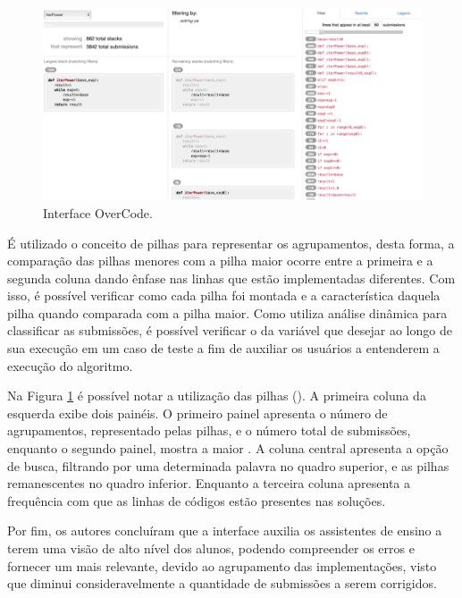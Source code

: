 	    \begin{figure}[ht]
	        \centering
	        \includegraphics[scale=0.4]{imagem/overCode.png}
	        \captionsetup{justification=centering}
	        \caption{Interface OverCode.}
	        \label{fig:interfaceOverCode}
	    \end{figure}
	    
	    É utilizado o conceito de pilhas para representar os agrupamentos, desta forma,
	    a comparação das pilhas menores com a pilha maior ocorre entre a primeira e a
	    segunda coluna dando ênfase nas linhas que estão implementadas diferentes. Com
	    isso, é possível verificar como cada pilha foi montada e a característica daquela
	    pilha quando comparada com a pilha maior. Como utiliza análise dinâmica para
	    classificar as submissões, é possível verificar o  da
	    variável que desejar ao longo de sua execução em um caso de teste a fim de
	    auxiliar os usuários a entenderem a execução do algoritmo.
	    
	    Na Figura \ref{fig:interfaceOverCode} é possível notar a utilização das pilhas
	    (). A primeira coluna da esquerda exibe dois painéis. O
	    primeiro painel apresenta o número de agrupamentos, representado pelas pilhas,
	    e o número total de submissões, enquanto o segundo painel, mostra a maior
	    . A coluna central apresenta a opção de busca, filtrando por
	    uma determinada palavra no quadro superior, e as pilhas remanescentes no
	    quadro inferior. Enquanto a terceira coluna apresenta a frequência com que as
	    linhas de códigos estão presentes nas soluções.
	    
	    Por fim, os autores concluíram que a interface auxilia os assistentes de
	    ensino a terem uma visão de alto nível dos alunos, podendo compreender os
	    erros e fornecer um  mais relevante, devido ao agrupamento
	    das implementações, visto que diminui consideravelmente a quantidade de
	    submissões a serem corrigidos.
	    
